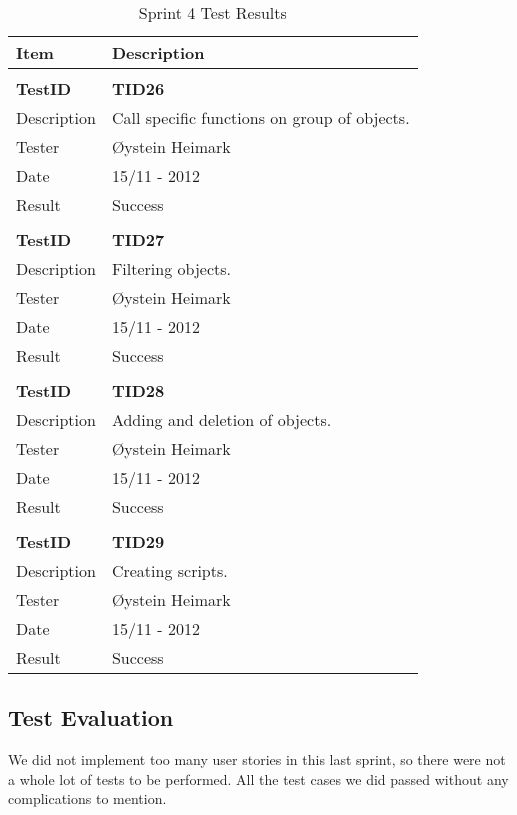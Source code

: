 \begin{table}
\caption{Sprint 4 Test Results}
\centering
\begin{tabular}{ l p{13cm} }

\hline 
Item			&Description		\\
\hline \\ [-2.0ex]

\bf{TestID}		&\bf{TID26}			\\
Description	&Call specific functions on group of objects.	\\
Tester		&Øystein Heimark	\\
Date			&15/11 - 2012	\\
Result		&Success				\\
\hline \\ [-2.0ex]

\bf{TestID}		&\bf{TID27}			\\
Description	&Filtering objects.  	\\
Tester		&Øystein Heimark	\\
Date			&15/11 - 2012	\\
Result		&Success			\\
\hline \\ [-2.0ex]

\bf{TestID}		&\bf{TID28}			\\
Description	&Adding and deletion of objects.	\\
Tester		&Øystein Heimark	\\
Date			&15/11 - 2012	\\
Result		&Success\\
\hline \\ [-2.0ex]

\bf{TestID}		&\bf{TID29}			\\
Description	&Creating scripts.	\\
Tester		&Øystein Heimark	\\
Date			&15/11 - 2012	\\
Result		&Success			\\
\hline

\end{tabular}
\label{table:sp4testresults}
\end{table}

\subsection{Test Evaluation}
We did not implement too many user stories in this last sprint, so there were not a whole lot of tests to be performed. All the test cases we did passed without any complications to mention.

